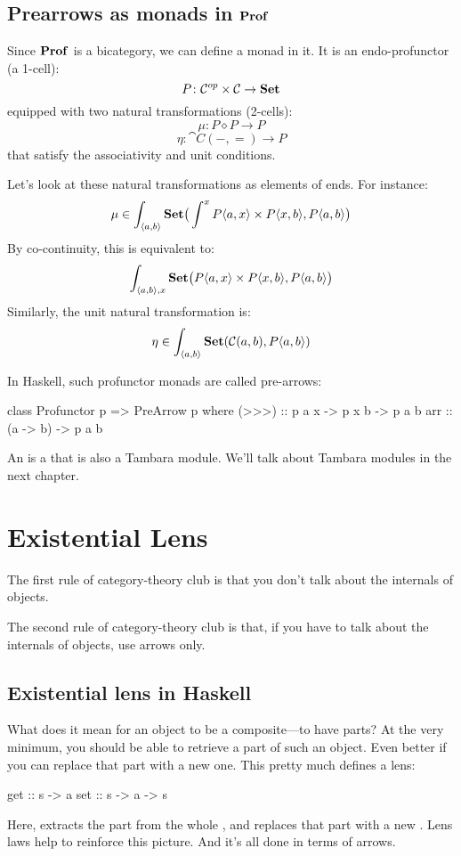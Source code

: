 \documentclass[DaoFP]{subfiles}
\begin{document}
\subsection{Prearrows as monads in $\mathbf{Prof}$}

Since $\mathbf{Prof}$ is a bicategory, we can define a monad in it. It is an endo-profunctor (a 1-cell):
\[ P \colon \mathcal{C}^{op} \times \mathcal{C} \to \mathbf{Set} \]
equipped with two natural transformations (2-cells):
\[ \mu \colon P \diamond P \to P \]
\[ \eta \colon \cat C(-, =) \to P \]
that satisfy the associativity and unit conditions.

Let's look at these natural transformations as elements of ends. For instance:
\[ \mu \in \int_{\langle a, b \rangle} \mathbf{Set} \big( \int^x P \langle a, x \rangle \times P \langle x, b \rangle,  P\langle a, b \rangle \big) \]
By co-continuity, this is equivalent to:
\[ \int_{\langle a, b \rangle, x} \mathbf{Set} \big(P \langle a, x \rangle \times P \langle x, b \rangle,  P\langle a, b \rangle \big) \]
Similarly, the unit natural transformation is:
\[ \eta \in \int_{\langle a, b \rangle} \mathbf{Set} (\mathcal{C}(a, b), P\langle a, b \rangle) \]

In Haskell, such profunctor monads are called pre-arrows:
\begin{haskell}
class Profunctor p => PreArrow p where
  (>>>) :: p a x -> p x b -> p a b
  arr   :: (a -> b) -> p a b
\end{haskell}
An  is a  that is also a Tambara module. We'll talk about Tambara modules in the next chapter.

\section{Existential Lens}

The first rule of category-theory club is that you don't talk about the internals of objects.

The second rule of category-theory club is that, if you have to talk about the internals of objects, use arrows only.

\subsection{Existential lens in Haskell}

What does it mean for an object to be a composite---to have parts? At the very minimum, you should be able to retrieve a part of such an object. Even better if you can replace that part with a new one. This pretty much defines a lens:
\begin{haskell}
get :: s -> a
set :: s -> a -> s
\end{haskell}
Here,  extracts the part  from the whole , and  replaces that part with a new . Lens laws help to reinforce this picture. And it's all done in terms of arrows. 
\end{document}
